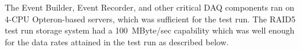 The Event Builder, Event Recorder, and other critical DAQ components ran on 
4-CPU Opteron-based servers, which was sufficient for the test run. The RAID5 test run storage system 
had a 100~MByte/sec capability which was well enough for the data rates attained in the test run as 
described below. 






